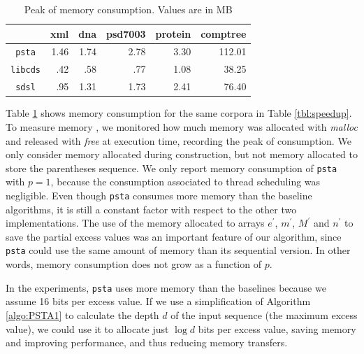 \begin{table}[ht]
  \centering
  \begin{tabular}{crrrrr}
\hline
    & xml & dna & psd7003 & protein & comptree\\
\hline
 \verb|psta|   &  1.46  &  1.74  & 2.78  &  3.30 & 112.01\\
 \verb|libcds|   &  .42 &  .58 & .77 &  1.08 & 38.25\\
 \verb|sdsl|   &  .95 &  1.31 & 1.73 &  2.41 & 76.40\\
 \hline
\end{tabular}
\caption{Peak of memory consumption. Values are in MB}
\label{tbl:memory_consumption}
\end{table}

Table \ref{tbl:memory_consumption} shows memory consumption for the
same corpora in Table \ref{tbl:speedup}. To measure memory , we
monitored how much memory was allocated with \emph{malloc} and
released with \emph{free} at execution time, recording the peak of
consumption. We only consider memory allocated during construction,
but not memory allocated to store the parentheses sequence. We only
report memory consumption of {\tt psta} with $p=1$, because the
consumption associated to thread scheduling was negligible. Even
though {\tt psta} consumes more memory than the baseline algorithms,
it is still a constant factor with respect to the other two
implementations. The use of the memory allocated to arrays
$e^{\prime}$, $m^{\prime}$, $M^{\prime}$ and $n^{\prime}$ to save the
partial excess values was an important feature of our algorithm, since
{\tt psta} could use the same amount of memory than its sequential
version. In other words, memory consumption does not grow as a
function of $p$.

In the experiments, {\tt psta} uses more memory than the baselines
because we assume 16 bits per excess value. If we use a simplification
of Algorithm \ref{algo:PSTA1} to calculate the depth $d$ of the input
sequence (the maximum excess value), we could use it to allocate just
$\log d$ bits per excess value, saving memory and improving
performance, and thus reducing memory transfers.














